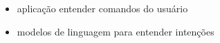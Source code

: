 
\begin{itemize}
	\item aplicação entender comandos do usuário
	\item modelos de linguagem para entender intenções
\end{itemize}
